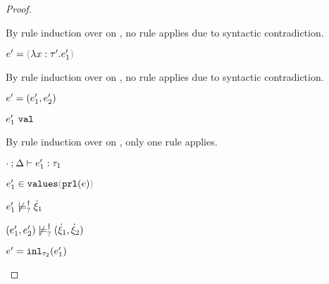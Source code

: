 \begin{proof}
\begin{byCases}
\begin{byCases}
\begin{byCases}
\begin{byCases}
\begin{byCases}
\begin{pfsteps*}
            \end{pfsteps*} 
            By rule induction over  on , no rule applies due to syntactic contradiction.
            \item[\text{(\ref{rule:VLam})}]
            \begin{pfsteps*} 
            \item $e'=\hlam{x}{\tau'}{e_1'}$ 
            \end{pfsteps*}
            By rule induction over  on , no rule applies due to syntactic contradiction.
            \item[\text{(\ref{rule:VPair})}] 
            \begin{pfsteps*} 
            \item $e'=(e_1' , e_2')$ 
            \item $e_1' ~\mathtt{val}$  
            \end{pfsteps*}
            By rule induction over  on , only one rule applies.
            \begin{byCases}
              \item[\text{(\ref{rule:TPair})}]
              \begin{pfsteps*}
              \item $\cdot \mathbin{;} \Delta \vdash e_1' : \tau_1$  
              \item $\inValues{e_1'}{\hprl{e}}$  
              \item $e_1' \not\models_{?}^{\dag} \dot{\xi}_1$  
              \item $(e_1' , e_2') \not\models_{?}^{\dag} (\dot{\xi}_1 , \dot{\xi}_2)$ 
              \end{pfsteps*} 
            \end{byCases}
            \item[\text{(\ref{rule:VInl})}] 
            \begin{pfsteps*} 
            \item $e'=\mathtt{inl}_{\tau_2}({e_1'})$ 

\end{pfsteps*}
\end{byCases}
\end{byCases}
\end{byCases}
\end{byCases}
\end{byCases}
\end{proof}
